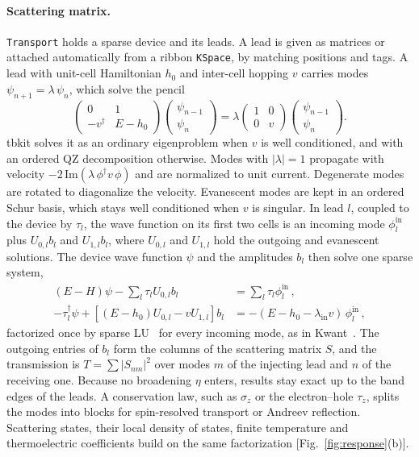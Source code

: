 \documentclass[submission, Phys]{SciPost}
\newcommand{\code}[1]{\texttt{#1}}
\begin{document}
\paragraph{Scattering matrix.} \code{Transport} holds a sparse device and
its leads. A lead is given as matrices or attached automatically from a
ribbon \code{KSpace}, by matching positions and tags. A lead with unit-cell
Hamiltonian $h_0$ and inter-cell hopping $v$ carries modes
$\psi_{n+1} = \lambda\,\psi_n$, which solve the pencil
\begin{equation}
\begin{pmatrix} 0 & 1 \\ -v^\dagger & E - h_0 \end{pmatrix}
\begin{pmatrix} \psi_{n-1} \\ \psi_n \end{pmatrix}
= \lambda
\begin{pmatrix} 1 & 0 \\ 0 & v \end{pmatrix}
\begin{pmatrix} \psi_{n-1} \\ \psi_n \end{pmatrix}.
\label{eq:pencil}
\end{equation}
tbkit solves it as an ordinary eigenproblem when $v$ is well conditioned,
and with an ordered QZ decomposition otherwise. Modes with $|\lambda| = 1$
propagate with velocity $-2\,\mathrm{Im}(\lambda\,\phi^\dagger v\,\phi)$
and are normalized to unit current. Degenerate modes are rotated to
diagonalize the velocity. Evanescent modes are kept in an ordered Schur
basis, which stays well conditioned when $v$ is singular. In lead $l$,
coupled to the device by $\tau_l$, the wave function on its first two cells
is an incoming mode $\phi^{\mathrm{in}}_l$ plus $U_{0,l}b_l$ and
$U_{1,l}b_l$, where $U_{0,l}$ and $U_{1,l}$ hold the outgoing and
evanescent solutions. The device wave function $\psi$ and the amplitudes
$b_l$ then solve one sparse system,
\begin{equation}
\begin{aligned}
(E - H)\psi - \sum_l\tau_l U_{0,l}b_l &= \sum_l\tau_l\phi^{\mathrm{in}}_l\,,\\
-\tau_l^\dagger\psi + \left[(E - h_0)U_{0,l} - vU_{1,l}\right]b_l
  &= -(E - h_0 - \lambda_{\mathrm{in}}v)\,\phi^{\mathrm{in}}_l\,,
\end{aligned}
\label{eq:scattering}
\end{equation}
factorized once by sparse LU~\cite{li2005} for every incoming mode, as in
Kwant~\cite{groth2014}. The outgoing entries of $b_l$ form the columns of
the scattering matrix $S$, and the transmission is
$T = \sum |S_{nm}|^2$ over modes $m$ of the injecting lead and $n$ of the
receiving one. Because no broadening $\eta$ enters, results stay exact up
to the band edges of the leads. A conservation law, such as $\sigma_z$ or the
electron--hole $\tau_z$, splits the modes into blocks for spin-resolved
transport or Andreev reflection. Scattering states, their local density of
states, finite temperature and thermoelectric coefficients build on the
same factorization [Fig.~\ref{fig:response}(b)].
\end{document}
